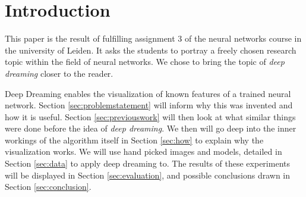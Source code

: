 \section{Introduction}
This paper is the result of fulfilling assignment 3 of the neural networks course in the university of Leiden.
It asks the students to portray a freely chosen research topic within the field of neural networks.
We chose to bring the topic of \textit{deep dreaming} closer to the reader.

Deep Dreaming enables the visualization of known features of a trained neural network.
Section \ref{sec:problemstatement} will inform why this was invented and how it is useful.
Section \ref{sec:previouswork} will then look at what similar things were done before the idea of \textit{deep dreaming}.
We then will go deep into the inner workings of the algorithm itself in Section \ref{sec:how} to explain why the visualization works.
We will use hand picked images and models, detailed in Section \ref{sec:data} to apply deep dreaming to. The results of these experiments will be displayed in Section \ref{sec:evaluation}, and possible conclusions drawn in Section \ref{sec:conclusion}.




